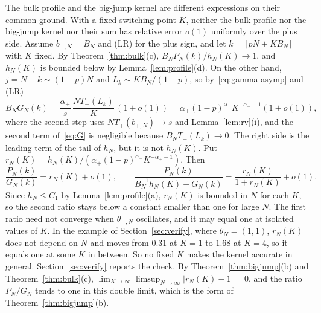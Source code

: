 \begin{remark}\label{rem:no-single-formula}
The bulk profile and the big-jump kernel are different expressions on their
common ground. With a fixed switching point $K$, neither the bulk profile nor the
big-jump kernel nor their sum has relative error $o(1)$ uniformly over the plus
side. Assume $b_{\plus,N}=B_N$ and
(LR) for the plus sign, and let $k=\lceil pN+KB_N\rceil$ with $K$ fixed. By Theorem~\ref{thm:bulk}(c),
$B_NP_N(k)/h_N(K)\to1$, and $h_N(K)$ is bounded below by Lemma~\ref{lem:profile}(d).
On the other hand, $j=N-k\sim(1-p)N$ and $L_k\sim KB_N/(1-p)$, so
by~\eqref{eq:gamma-asymp} and (LR)
\[
 B_NG_N(k)=\frac{\alpha_\plus}{s}\,\frac{NT_\plus(L_k)}{K}\,(1+o(1))=\alpha_\plus(1-p)^{\alpha_\plus}K^{-\alpha_\plus-1}(1+o(1)),
\]
where the second step uses $NT_\plus(b_{\plus,N})\to s$ and Lemma~\ref{lem:rv}(i), and
the second term of~\eqref{eq:G} is negligible because $B_NT_\plus(L_k)\to0$. The right side is the
leading term of the tail of $h_N$, but it is not $h_N(K)$. Put
$r_N(K)=h_N(K)/(\alpha_\plus(1-p)^{\alpha_\plus}K^{-\alpha_\plus-1})$. Then
\[
 \frac{P_N(k)}{G_N(k)}=r_N(K)+o(1),\qquad
 \frac{P_N(k)}{B_N^{-1}h_N(K)+G_N(k)}=\frac{r_N(K)}{1+r_N(K)}+o(1).
\]
Since $h_N\le C_1$ by Lemma~\ref{lem:profile}(a), $r_N(K)$ is bounded in $N$ for each
$K$, so the second ratio stays below a constant smaller than one for large $N$. The
first ratio need not converge when $\theta_{\minus,N}$ oscillates, and it may equal
one at isolated values of $K$. In the example of Section~\ref{sec:verify}, where
$\theta_N=(1,1)$, $r_N(K)$ does not depend on $N$ and moves from $0.31$ at $K=1$ to
$1.68$ at $K=4$, so it equals one at some $K$ in between. So no fixed $K$ makes the
kernel accurate in general. Section~\ref{sec:verify} reports the check. By
Theorem~\ref{thm:bigjump}(b) and Theorem~\ref{thm:bulk}(c),
$\lim_{K\to\infty}\limsup_{N\to\infty}|r_N(K)-1|=0$, and the ratio $P_N/G_N$ tends to
one in this double limit, which is the form of Theorem~\ref{thm:bigjump}(b).
\end{remark}

